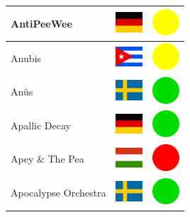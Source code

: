 \documentclass[12pt, a4paper, twoside]{report}
\begin{document}
\begin{center}
\begin{longtable}{|p{5cm}|p{2cm}|p{2cm}|}
 AntiPeeWee                                                 & \includegraphics[width=1cm]{../img/flags/de} &   \includegraphics[width=1cm]{../likes/m} \\ \hline
 Anubis                                                     & \includegraphics[width=1cm]{../img/flags/cu} &   \includegraphics[width=1cm]{../likes/m} \\ \hline
 Anüs                                                       & \includegraphics[width=1cm]{../img/flags/se} &   \includegraphics[width=1cm]{../likes/y} \\ \hline
 Apallic Decay                                              & \includegraphics[width=1cm]{../img/flags/de} &   \includegraphics[width=1cm]{../likes/y} \\ \hline
 Apey \& The Pea                                            & \includegraphics[width=1cm]{../img/flags/hu} &   \includegraphics[width=1cm]{../likes/n} \\ \hline
 Apocalypse Orchestra                                       & \includegraphics[width=1cm]{../img/flags/se} &   \includegraphics[width=1cm]{../likes/y} \\ \hline

\end{longtable}
\end{center}
\end{document}
